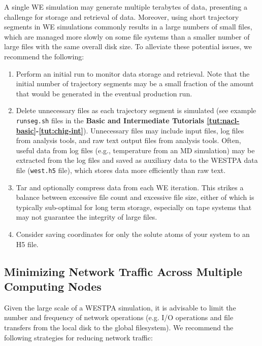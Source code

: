 A single WE simulation may generate multiple terabytes of data, presenting a challenge for storage and retrieval of data. 
Moreover, using short trajectory segments in WE simulations commonly results in a large numbers of small files, which are managed more slowly on some file systems than a smaller number of large files with the same overall disk size. 
To alleviate these potential issues, we recommend the following:

\begin{enumerate}
\item Perform an initial run to monitor data storage and retrieval. 
Note that the initial number of trajectory segments may be a small fraction of the amount that would be generated in the eventual production run. 
\item Delete unnecessary files as each trajectory segment is simulated (see example \verb|runseg.sh| files in the \textbf{Basic and Intermediate Tutorials \ref{tut:nacl-basic}-\ref{tut:chig-int}}). 
Unnecessary files may include input files, log files from analysis tools, and raw text output files from analysis tools. 
Often, useful data from log files (e.g., temperature from an MD simulation) may be extracted from the log files and saved as auxiliary data to the WESTPA data file (\verb|west.h5| file), which stores data more efficiently than raw text.
\item Tar and optionally compress data from each WE iteration. 
This strikes a balance between excessive file count and excessive file size, either of which is typically sub-optimal for long term storage, especially on tape systems that may not guarantee the integrity of large files.
\item Consider saving coordinates for only the solute atoms of your system to an H5 file.
\end{enumerate}
\pagebreak

\subsection{Minimizing Network Traffic Across Multiple Computing Nodes}
Given the large scale of a WESTPA simulation, it is advisable to limit the number and frequency of network operations (e.g. I/O operations and file transfers from the local disk to the global filesystem). 
We recommend the following strategies for reducing network traffic:

